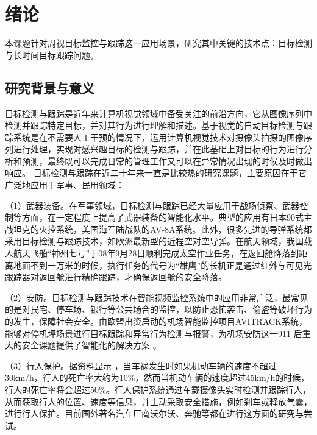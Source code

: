 
\chapter{绪论}
本课题针对周视目标监控与跟踪这一应用场景，研究其中关键的技术点：目标检测与长时间目标跟踪问题。

\section{研究背景与意义}
目标检测与跟踪是近年来计算机视觉领域中备受关注的前沿方向，它从图像序列中检测并跟踪特定目标，并对其行为进行理解和描述。基于视觉的自动目标检测与跟踪系统是在不需要人工干预的情况下，运用计算机视觉技术对摄像头拍摄的图像序列进行处理，实现对感兴趣目标的检测与跟踪，并在此基础上对目标的行为进行分析和预测，最终既可以完成日常的管理工作又可以在异常情况出现的时候及时做出响应。
目标检测与跟踪在近二十年来一直是比较热的研究课题，主要原因在于它广泛地应用于军事、民用领域：
\begin{namelist}{}
	\item（1）武器装备。在军事领域，目标检测与跟踪已经大量应用于战场侦察、武器控制等方面，在一定程度上提高了武器装备的智能化水平。典型的应用有日本90式主战坦克的火控系统，美国海军陆战队的AV-8A系统。此外，很多先进的导弹系统都采用目标检测与跟踪技术，如欧洲最新型的近程空对空导弹。在航天领域，我国载人航天飞船“神州七号”于08年9月28日顺利完成太空作业任务，在返回舱降落到距离地面不到一万米的时候，执行任务的代号为“雄鹰”的长机正是通过红外与可见光跟踪器对返回舱进行精确跟踪，才确保返回舱的安全降落。
	\item（2）安防。目标检测与跟踪技术在智能视频监控系统中的应用非常广泛，最常见的是对民宅、停车场、银行等公共场合的监控，以防止恐怖袭击、偷盗等破坏行为的发生，保障社会安全。由欧盟出资启动的机场智能监控项目AVITRACK系统，能够对停机坪场景进行目标跟踪和异常行为检测与报警，为机场安防这一911 后重大的安全课题提供了智能化的解决方案 \cite{avitrack}。
	\item（3）行人保护。据资料显示 \cite{vehicle}，当车祸发生时如果机动车辆的速度不超过30km/h，行人的死亡率大约为10\%，然而当机动车辆的速度超过45km/h的时候，行人的死亡率将会超过50\%。行人保护系统通过车载摄像头实时检测并跟踪行人，从而获取行人的位置、速度等信息，并主动采取安全措施，例如刹车或释放气囊，进行行人保护。目前国外著名汽车厂商沃尔沃、奔驰等都在进行这方面的研究与尝试。
\end{namelist}

